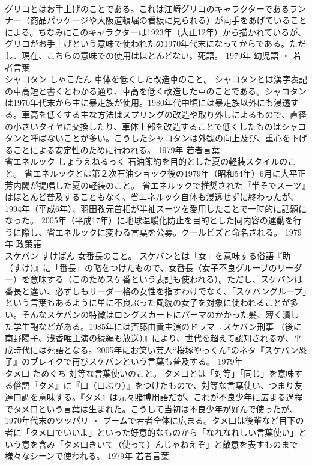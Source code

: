 \documentclass[8pt]{extreport}
\begin{document}
\begin{CJK}{UTF8}{min}
\\	グリコとはお手上げのことである。これは江崎グリコのキャラクターであるランナー（商品パッケージや大阪道頓堀の看板に見られる）が両手をあげていることによる。ちなみにこのキャラクターは1923年（大正12年）から描かれているが、グリコがお手上げという意味で使われたの1970年代末になってからである。ただし、現在、こちらの意味での使用はほとんどない。死語。	1979年	幼児語 ・ 若者言葉	
\\	シャコタン	しゃこたん	車体を低くした改造車のこと。	シャコタンとは漢字表記の車高短と書くとわかる通り、車高を低く改造した車のことである。シャコタンは1970年代末から主に暴走族が使用。1980年代中頃には暴走族以外にも浸透する。車高を低くする主な方法はスプリングの改造や取り外しによるもので、直径の小さいタイヤに交換したり、車体上部を改造することで低くしたものはシャコタンと呼ばないことが多い。こうしたシャコタンは外観の向上及び、重心を下げることによる安定性のために行われる。	1979年	若者言葉	
\\	省エネルック	しょうえねるっく	石油節約を目的とした夏の軽装スタイルのこと。	省エネルックとは第２次石油ショック後の1979年（昭和54年）6月に大平正芳内閣が提唱した夏の軽装のこと。 省エネルックで推奨された『半そでスーツ』はほとんど普及することもなく、省エネルック自体も浸透せずに終わったが、1994年（平成6年）、羽田孜元首相が半袖スーツを愛用したことで一時的に話題になった。 2005年（平成17年）に地球温暖化防止を目的とした同内容の運動を行うに際し、省エネルックに変わる言葉を公募。クールビズと命名される。	1979年	政策語	
\\	スケバン	すけばん	女番長のこと。	スケバンとは「女」を意味する俗語『助（すけ）』に「番長」の略をつけたもので、女番長（女子不良グループのリーダー）を意味する（このためスケ番という表記も使われる）。ただし、スケバンは番長と違い、必ずしもリーダー格の女性を指すわけでなく、「スケバングループ」という言葉もあるように単に不良ぶった風貌の女子を対象に使われることが多い。そんなスケバンの特徴はロングスカートにパーマのかかった髪、薄く潰した学生鞄などがある。1985年には斉藤由貴主演のドラマ『スケバン刑事 （後に南野陽子、浅香唯主演の続編も放送）』により、世代を超えて認知されるが、平成時代には死語となる。2005年にお笑い芸人“桜塚やっくん”のネタ『スケバン恐子』のブレイクで再びスケバンという言葉も普及する。	1979年	
\\	タメ口	ためぐち	対等な言葉使いのこと。	タメ口とは「対等」「同じ」を意味する俗語『タメ』に『口（口ぶり）』をつけたもので、対等な言葉使い、つまり友達口調を意味する。『タメ』は元々賭博用語だが、これが不良少年に広まる過程でタメ口という言葉は生まれた。こうして当初は不良少年が好んで使ったが、1970年代末のツッパリ ・ ブームで若者全体に広まる。タメ口は後輩など目下の者に「タメ口でいいよ」といった好意的なものから「なれなれしい言葉使い」という意を含み「タメ口きいて（使って）んじゃねえぞ」と敵意を表すものまで様々なシーンで使われる。	1979年	若者言葉	

\end{CJK}
\end{document}
